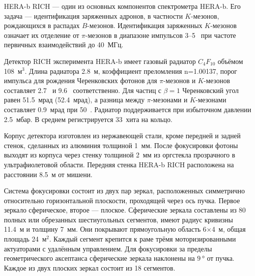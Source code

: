 HERA-b RICH --- один из основных компонентов спектрометра HERA-b. Его задача --- идентификация заряженных адронов, в частности $K$-мезонов, рождающихся в распадах $B$-мезонов. Идентификация заряженных $K$-мезонов означает их отделение от $\pi$-мезонов в диапазоне импульсов 3--5~\GeVoverC{} при частоте первичных взаимодействий до 40~МГц.


Детектор RICH эксперимента HERA-b имеет газовый радиатор $C_{4}F_{10}$ объёмом 108~м$^3$. Длина радиатора 2.8~м, коэффициент преломления n=1.00137, порог импульса для рождения Черенковских фотонов для $\pi$-мезонов и $K$-мезонов составляет 2.7~\GeVoverC{} и 9.6~\GeVoverC{} соответственно. Для частиц с $\beta=1$ Черенковский угол равен 51.5~мрад (52.4~мрад), а разница между $\pi$-мезонами и $K$-мезонами составляет 0.9~мрад при 50~\GeVoverC{}. Радиатор поддерживается при избыточном давлении 2.5~мбар. В среднем регистрируется 33~хита на кольцо.


Корпус детектора изготовлен из нержавеющей стали, кроме передней и задней стенок, сделанных из алюминия толщиной 1~мм. После фокусировки фотоны выходят из корпуса через стенку толщиной 2~мм из оргстекла прозрачного в ультрафиолетовой области. Передняя стенка HERA-b RICH расположена на расстоянии 8.5~м от мишени.

Система фокусировки состоит из двух пар зеркал, расположенных симметрично относительно горизонтальной плоскости, проходящей через ось пучка. Первое зеркало сферическое, второе --- плоское. Сферические зеркала составлены из 80 полных или обрезанных шестиугольных сегментов, имеют радиус кривизны 11.4~м и толщину 7~мм. Они покрывают прямоугольную область 6$\times$4~м, общая площадь 24~м$^2$. Каждый сегмент крепится к раме трёмя моторизированными актуаторами с удалённым управлением. Для фокусировки за пределы геометрического аксептанса сферические зеркала наклонены на $\SI{9}{\degree}$ от пучка. Каждое из двух плоских зеркал состоит из 18 сегментов.

